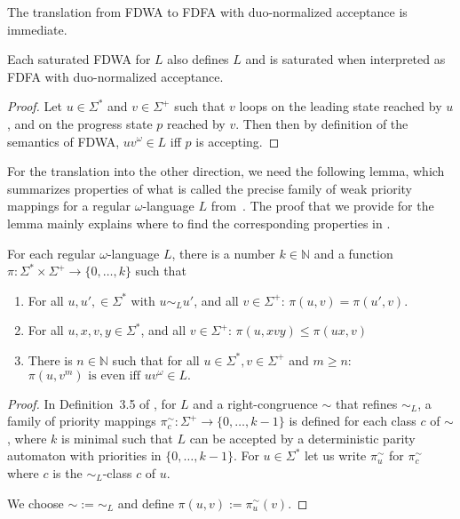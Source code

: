 \documentclass[a4paper,USenglish,cleveref,autoref,thm-restate]{lipics-v2021}
\begin{document}
{The translation from FDWA to FDFA with duo-normalized acceptance is immediate.
\begin{lemma}
Each saturated FDWA for $L$ also defines $L$ and is saturated when interpreted as FDFA with duo-normalized acceptance.
\end{lemma}
\begin{proof}
Let $u \in \Sigma^*$ and $v \in \Sigma^+$ such that $v$ loops on the leading state reached by $u$, and on the progress state $p$ reached by $v$. Then then by definition of the semantics of FDWA, $uv^\omega \in L$ iff  $p$ is accepting.
\end{proof}

For the translation into the other direction, we need the following lemma, which summarizes properties of what is called the precise family of weak priority mappings for a regular $\omega$-language $L$ from~\cite{BohnL24}. The proof that we provide for the lemma mainly explains where to find the corresponding properties in \cite{BohnL24}.

\begin{lemma}\label{lem:precise-mapping}
  For each regular $\omega$-language $L$, there is a number $k \in \mathbb{N}$ and a function $\pi: \Sigma^* \times \Sigma^+ \rightarrow \{0,\ldots,k\}$ such that
  \begin{enumerate}
  \item For all $u,u',\in \Sigma^*$ with $u \sim_L u'$, and all $v \in \Sigma^+$:\; $\pi(u,v) = \pi(u',v)$.
  \item For all $u,x,v,y \in \Sigma^*$, and all $v \in \Sigma^+$:\; $\pi(u,xvy) \le \pi(ux,v)$
  \item There is $n \in \mathbb{N}$ such that for all $u \in \Sigma^*, v \in \Sigma^+$ and $m \ge n$:\;
$
\pi(u,v^m) \text{ is even iff $uv^\omega \in L$.}
$
  \end{enumerate}
\end{lemma}
\begin{proof}
  In Definition~3.5 of \cite{BohnL24}, for $L$ and a right-congruence $\sim$ that refines $\sim_L$, a family of priority mappings $\pi_c^\sim:\Sigma^+ \rightarrow \{0,\ldots,k-1\}$ is defined for each class $c$ of $\sim$, where $k$ is minimal such that $L$ can be accepted by a deterministic parity automaton with priorities in $\{0, \ldots, k-1\}$. For $u \in \Sigma^*$ let us write $\pi_u^\sim$ for $\pi_c^\sim$ where $c$ is the $\sim_L$-class $c$ of $u$.
  
  We choose $\sim := \sim_L$ and define $\pi(u,v) := \pi_u^\sim(v)$. 


\end{proof}}
\end{document}
